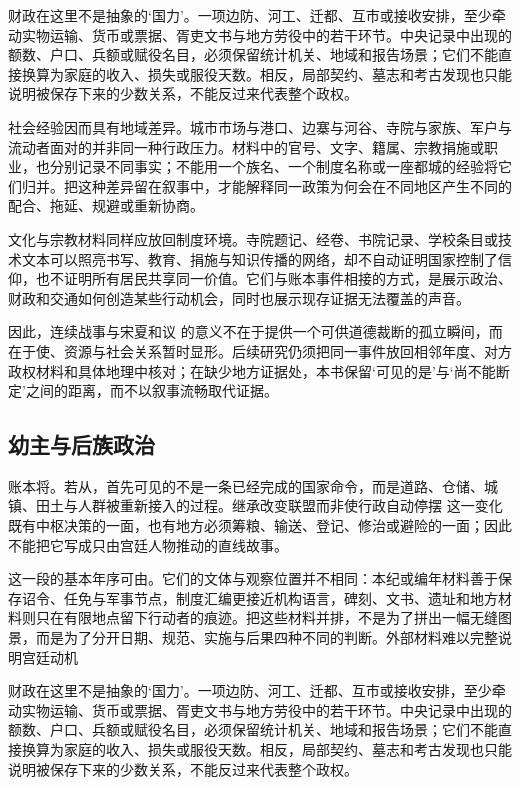 财政在这里不是抽象的‘国力’。一项边防、河工、迁都、互市或接收安排，至少牵动实物运输、货币或票据、胥吏文书与地方劳役中的若干环节。中央记录中出现的额数、户口、兵额或赋役名目，必须保留统计机关、地域和报告场景；它们不能直接换算为家庭的收入、损失或服役天数。相反，局部契约、墓志和考古发现也只能说明被保存下来的少数关系，不能反过来代表整个政权。

社会经验因而具有地域差异。城市市场与港口、边寨与河谷、寺院与家族、军户与流动者面对的并非同一种行政压力。材料中的官号、文字、籍属、宗教捐施或职业，也分别记录不同事实；不能用一个族名、一个制度名称或一座都城的经验将它们归并。把这种差异留在叙事中，才能解释同一政策为何会在不同地区产生不同的配合、拖延、规避或重新协商。

文化与宗教材料同样应放回制度环境。寺院题记、经卷、书院记录、学校条目或技术文本可以照亮书写、教育、捐施与知识传播的网络，却不自动证明国家控制了信仰，也不证明所有居民共享同一价值。它们与账本事件相接的方式，是展示政治、财政和交通如何创造某些行动机会，同时也展示现存证据无法覆盖的声音。

因此，连续战事与宋夏和议 的意义不在于提供一个可供道德裁断的孤立瞬间，而在于使、资源与社会关系暂时显形。后续研究仍须把同一事件放回相邻年度、对方政权材料和具体地理中核对；在缺少地方证据处，本书保留‘可见的是’与‘尚不能断定’之间的距离，而不以叙事流畅取代证据。

\subsection{幼主与后族政治}

账本将。若从，首先可见的不是一条已经完成的国家命令，而是道路、仓储、城镇、田土与人群被重新接入的过程。继承改变联盟而非使行政自动停摆 这一变化既有中枢决策的一面，也有地方必须筹粮、输送、登记、修治或避险的一面；因此不能把它写成只由宫廷人物推动的直线故事。

这一段的基本年序可由。它们的文体与观察位置并不相同：本纪或编年材料善于保存诏令、任免与军事节点，制度汇编更接近机构语言，碑刻、文书、遗址和地方材料则只在有限地点留下行动者的痕迹。把这些材料并排，不是为了拼出一幅无缝图景，而是为了分开日期、规范、实施与后果四种不同的判断。外部材料难以完整说明宫廷动机

财政在这里不是抽象的‘国力’。一项边防、河工、迁都、互市或接收安排，至少牵动实物运输、货币或票据、胥吏文书与地方劳役中的若干环节。中央记录中出现的额数、户口、兵额或赋役名目，必须保留统计机关、地域和报告场景；它们不能直接换算为家庭的收入、损失或服役天数。相反，局部契约、墓志和考古发现也只能说明被保存下来的少数关系，不能反过来代表整个政权。

